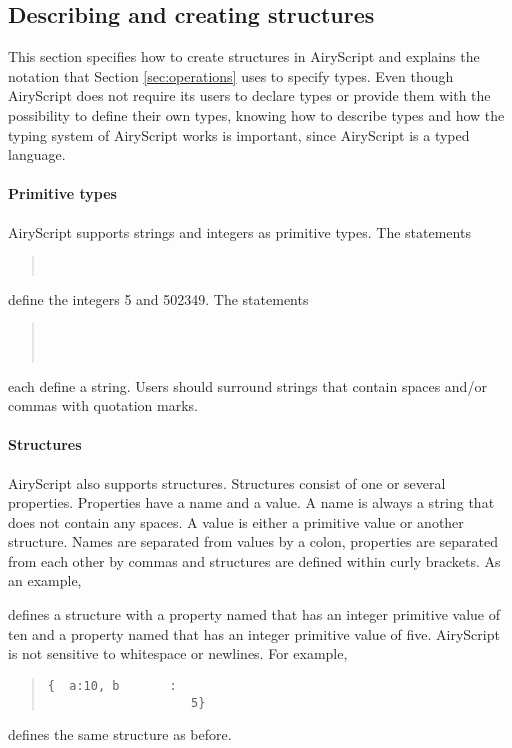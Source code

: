 \subsection{Describing and creating structures}
\label{sec:syntax_spec}
This section specifies how to create structures in AiryScript and explains the
notation that Section \ref{sec:operations} uses to specify types. Even though
AiryScript does not require its users to declare types or provide them with
the possibility to define their own types, knowing how to describe types and how
the typing system of AiryScript works is important, since AiryScript is a typed
language.

\paragraph{Primitive types}
AiryScript supports strings and integers as primitive types. The statements
\begin{quote}
  \\
\end{quote}
define the integers 5 and 502349. The statements
\begin{quote}
  \\
  \\
\end{quote}
each define a string. Users should surround strings that contain spaces and/or
commas with quotation marks.


\paragraph{Structures}
AiryScript also supports structures. Structures consist of one or several
properties. Properties have a name and a value. A name is always a string that
does not contain any spaces. A value is either a primitive value or another
structure. Names are separated from values by a colon, properties are separated
from each other by commas and structures are defined within curly brackets. As
an example,
\begin{quote}
\end{quote}
defines a structure with a property named  that has an integer primitive
value of ten and a property named  that has an integer primitive value of
five. AiryScript is not sensitive to whitespace or newlines. For example,
\begin{quote}
  \begin{verbatim}
{  a:10, b       :
                    5}
  \end{verbatim}
\end{quote}
defines the same structure as before.


